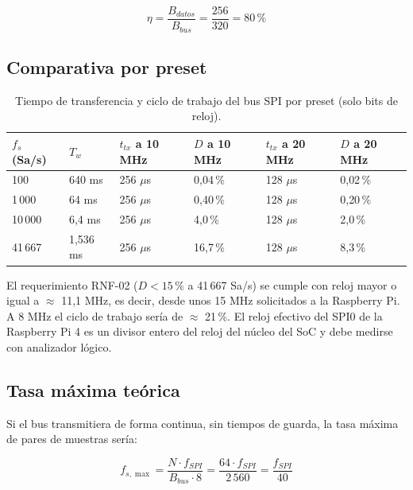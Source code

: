 \documentclass[12pt,a4paper]{article}
\begin{document}
\begin{equation}
\eta = \frac{B_{datos}}{B_{bus}} = \frac{256}{320} = 80\,\%
\end{equation}

\subsection{Comparativa por preset}

\begin{table}[H]
\centering
\small
\begin{tabular}{@{}p{2.2cm} p{2.3cm} p{2.6cm} p{2.6cm} p{2.6cm} p{2.6cm}@{}}
\toprule
\textbf{$f_s$ (Sa/s)} & \textbf{$T_w$} & \textbf{$t_{tx}$ a 10 MHz} & \textbf{$D$ a 10 MHz} & \textbf{$t_{tx}$ a 20 MHz} & \textbf{$D$ a 20 MHz} \\
\midrule
100     & 640 ms    & 256 $\mu$s & 0{,}04\,\% & 128 $\mu$s & 0{,}02\,\% \\
1\,000  & 64 ms     & 256 $\mu$s & 0{,}40\,\% & 128 $\mu$s & 0{,}20\,\% \\
10\,000 & 6{,}4 ms  & 256 $\mu$s & 4{,}0\,\%  & 128 $\mu$s & 2{,}0\,\% \\
41\,667 & 1{,}536 ms & 256 $\mu$s & 16{,}7\,\% & 128 $\mu$s & 8{,}3\,\% \\
\bottomrule
\end{tabular}
\caption{Tiempo de transferencia y ciclo de trabajo del bus SPI por preset (solo bits de reloj).}
\end{table}

El requerimiento RNF-02 ($D < 15\,\%$ a 41\,667 Sa/s) se cumple con reloj mayor o igual a $\approx$ 11{,}1 MHz, es decir, desde unos 15 MHz solicitados a la Raspberry Pi. A 8 MHz el ciclo de trabajo sería de $\approx$ 21\,\%. El reloj efectivo del SPI0 de la Raspberry Pi 4 es un divisor entero del reloj del núcleo del SoC y debe medirse con analizador lógico.

\subsection{Tasa máxima teórica}

Si el bus transmitiera de forma continua, sin tiempos de guarda, la tasa máxima de pares de muestras sería:

\begin{equation}
f_{s,\max} = \frac{N \cdot f_{SPI}}{B_{bus} \cdot 8} = \frac{64 \cdot f_{SPI}}{2\,560} = \frac{f_{SPI}}{40}
\end{equation}
\end{document}
